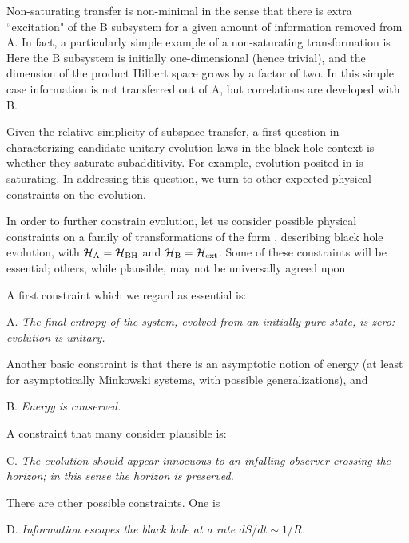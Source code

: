 Non-saturating transfer is non-minimal in the sense that there is extra ``excitation" of the B subsystem for a given amount of information removed from A\GiSh.  In fact, a particularly simple example of a non-saturating transformation is
%
\eqn{}
%
 Here the B subsystem is initially one-dimensional (hence trivial), and the dimension of the product Hilbert space grows by a factor of two.  In this simple case information is not transferred out of A, but correlations are developed with B.

Given the relative simplicity of subspace transfer, a first question in characterizing candidate unitary evolution laws in the black hole context is whether they saturate subadditivity.  For example, evolution posited in  is saturating.  In addressing this question, we turn to other expected physical constraints on the evolution.



In order to further constrain evolution, let us consider possible physical constraints on a family of transformations of the form \transf, describing black hole evolution, with ${{\cal H}_{\rm A}}={{\cal H}_{\rm BH}}$ and ${{\cal H}_{\rm B}}={{\cal H}_{\rm ext}}$.  Some of these constraints will be essential; others, while plausible, may not be universally agreed upon.

A first constraint which we regard as essential is:

\item{A.} {\it The final entropy of the system, evolved from an initially pure state, is zero: evolution is unitary.}

Another basic constraint is that  there is an asymptotic notion of energy (at least for asymptotically Minkowski systems, with possible generalizations), and 

\item{B.} {\it Energy is conserved.}

A constraint that many consider plausible is:

\item{C.} {\it The evolution should appear innocuous to an infalling observer crossing the horizon; in this sense the horizon is preserved.}

There are other possible constraints.  One is

\item{D.} {\it Information escapes the black hole at a rate $dS/dt\sim 1/R$.  }

